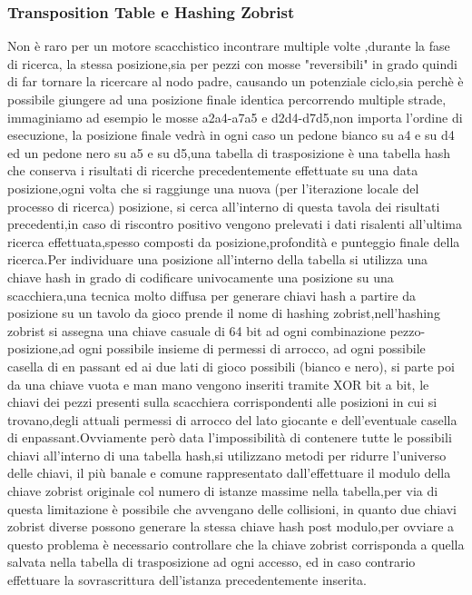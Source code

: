 \subsubsection{Transposition Table e Hashing Zobrist}
Non è raro per un motore scacchistico incontrare multiple volte ,durante la fase di ricerca, la stessa posizione,sia per pezzi con mosse "reversibili" in grado quindi di far tornare la ricercare al nodo padre,
causando un potenziale ciclo,sia perchè è possibile giungere ad una posizione finale identica percorrendo multiple strade, immaginiamo ad esempio le mosse a2a4-a7a5 e d2d4-d7d5,non importa l'ordine di esecuzione,
la posizione finale vedrà in ogni caso un pedone bianco su a4 e su d4 ed un pedone nero su a5 e su d5,una tabella di trasposizione è una tabella hash che conserva i risultati di ricerche precedentemente effettuate
su una data posizione,ogni volta che si raggiunge una nuova (per l'iterazione locale del processo di ricerca) posizione, si cerca all'interno di questa tavola dei risultati precedenti,in caso di riscontro positivo
vengono prelevati i dati risalenti all'ultima ricerca effettuata,spesso composti da posizione,profondità e punteggio finale della ricerca.Per individuare una posizione all'interno della tabella si utilizza una chiave
hash in grado di codificare univocamente una posizione su una scacchiera,una tecnica molto diffusa per generare chiavi hash a partire da posizione su un tavolo da gioco prende il nome di hashing zobrist,nell'hashing zobrist si assegna 
una chiave casuale di 64 bit ad ogni combinazione pezzo-posizione,ad ogni possibile insieme di permessi di arrocco, ad ogni possibile casella di en passant ed ai due lati di gioco possibili (bianco e nero),
si parte poi da una chiave vuota e man mano vengono inseriti tramite XOR bit a bit, le chiavi dei pezzi presenti sulla scacchiera corrispondenti alle posizioni in cui si trovano,degli attuali permessi di arrocco
del lato giocante e dell'eventuale casella di enpassant.Ovviamente però data l'impossibilità di contenere tutte le possibili chiavi all'interno di una tabella hash,si utilizzano metodi per ridurre l'universo delle chiavi,
il più banale e comune rappresentato dall'effettuare il modulo della chiave zobrist originale col numero di istanze massime nella tabella,per via di questa limitazione è possibile che avvengano delle collisioni,
in quanto due chiavi zobrist diverse possono generare la stessa chiave hash post modulo,per ovviare a questo problema è necessario controllare che la chiave zobrist corrisponda a quella salvata nella tabella di 
trasposizione ad ogni accesso, ed in caso contrario effettuare la sovrascrittura dell'istanza precedentemente inserita.



